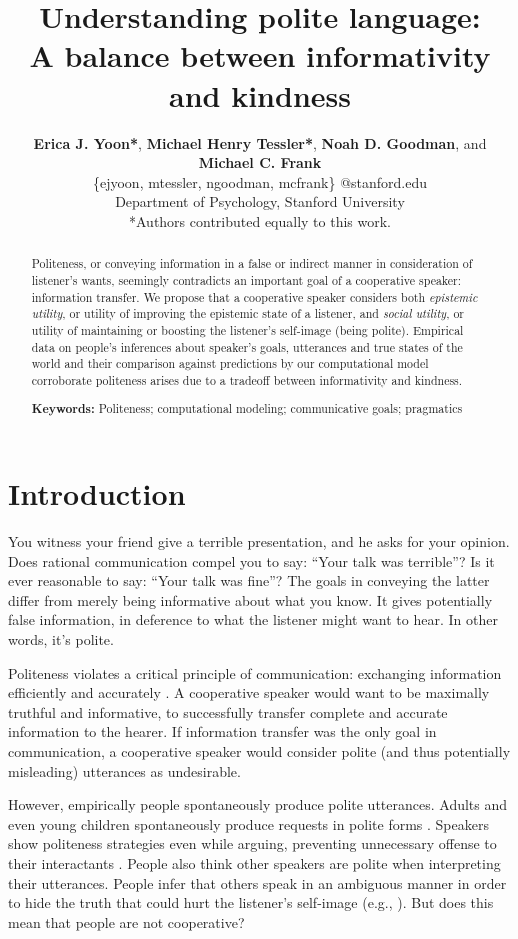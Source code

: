 \documentclass[10pt,letterpaper]{article}
\title{Understanding polite language: \\
A balance between informativity and kindness}
\author{ {\large \bf Erica J. Yoon*}, {\large \bf Michael Henry Tessler*}, {\large \bf Noah D. Goodman}, and {\large \bf Michael C. Frank}   \\
\{ejyoon, mtessler, ngoodman, mcfrank\} @stanford.edu \\ 
  Department of Psychology, Stanford University \\
  *Authors contributed equally to this work.}
\newcommand{\ndg}[1]{\textcolor{Green}{[ndg: #1]}}
\begin{document}
\maketitle


\begin{abstract}

Politeness, or conveying information in a false or indirect manner in consideration of listener's wants,
seemingly contradicts an important goal of a cooperative speaker: information transfer.
We propose that a cooperative speaker considers both
\emph{epistemic utility}, or utility of improving the epistemic state of a listener, 
and \emph{social utility}, or utility of maintaining or boosting the listener's self-image (being polite). 
Empirical data on people's inferences about speaker's goals, utterances and true states of the world
and their comparison against predictions by our computational model corroborate 
politeness arises due to a tradeoff between informativity and kindness.

\textbf{Keywords:} 
Politeness; computational modeling; communicative goals; pragmatics

\end{abstract}


\section{Introduction}
You witness your friend give a terrible presentation, and he asks for your opinion. 
Does rational communication compel you to say: ``Your talk was terrible''?
Is it ever reasonable to say: ``Your talk was fine''?
The goals in conveying the latter differ from merely being informative about what you know. 
It gives potentially false information, in deference to what the listener might want to hear.
In other words, it's polite.

Politeness violates a critical principle of communication: exchanging information efficiently and accurately \cite{Grice1975}. 
A cooperative speaker would want to be maximally truthful and informative, to successfully transfer complete and accurate information to the hearer. 
If information transfer was the only goal in communication, a cooperative speaker would consider polite (and thus potentially misleading) utterances as undesirable. 

However, empirically people spontaneously produce polite utterances.
Adults and even young children spontaneously produce requests in polite forms \cite{clark1980, axia1985}. 
Speakers show politeness strategies even while arguing, preventing unnecessary offense to their interactants \cite{holtgraves1997}.
People also think other speakers are polite when interpreting their utterances. 
People infer that others speak in an ambiguous manner in order to hide the truth that could hurt the listener's self-image (e.g., ). 
But does this mean that people are not cooperative? 
\end{document}
